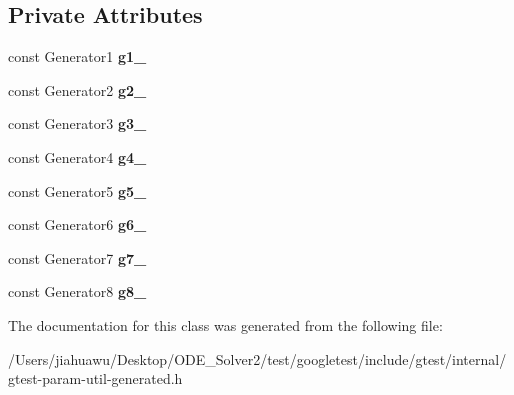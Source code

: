\subsection*{Private Attributes}
\begin{DoxyCompactItemize}
\item 
\mbox{\label{classtesting_1_1internal_1_1_cartesian_product_holder8_a2b8ddbf3089772ad7f72fda55ccc7619}} 
const Generator1 {\bfseries g1\+\_\+}
\item 
\mbox{\label{classtesting_1_1internal_1_1_cartesian_product_holder8_a2cc5c2260e92420d62ddf92a65a12ae9}} 
const Generator2 {\bfseries g2\+\_\+}
\item 
\mbox{\label{classtesting_1_1internal_1_1_cartesian_product_holder8_ad23e73ea1c02994e35bde78e9f2970c4}} 
const Generator3 {\bfseries g3\+\_\+}
\item 
\mbox{\label{classtesting_1_1internal_1_1_cartesian_product_holder8_aff1efff76694a878b1d89a8142ad8a31}} 
const Generator4 {\bfseries g4\+\_\+}
\item 
\mbox{\label{classtesting_1_1internal_1_1_cartesian_product_holder8_a76835e24663f1e188cab3719a736aa17}} 
const Generator5 {\bfseries g5\+\_\+}
\item 
\mbox{\label{classtesting_1_1internal_1_1_cartesian_product_holder8_ae4ea6cb4a0a257c2627a24e92fcc01cd}} 
const Generator6 {\bfseries g6\+\_\+}
\item 
\mbox{\label{classtesting_1_1internal_1_1_cartesian_product_holder8_a8c1a3c407a3694515efaf1904bcb91c4}} 
const Generator7 {\bfseries g7\+\_\+}
\item 
\mbox{\label{classtesting_1_1internal_1_1_cartesian_product_holder8_a83fea6a85f0a7227855e383572bdcd03}} 
const Generator8 {\bfseries g8\+\_\+}
\end{DoxyCompactItemize}


The documentation for this class was generated from the following file\+:\begin{DoxyCompactItemize}
\item 
/\+Users/jiahuawu/\+Desktop/\+O\+D\+E\+\_\+\+Solver2/test/googletest/include/gtest/internal/gtest-\/param-\/util-\/generated.\+h\end{DoxyCompactItemize}
